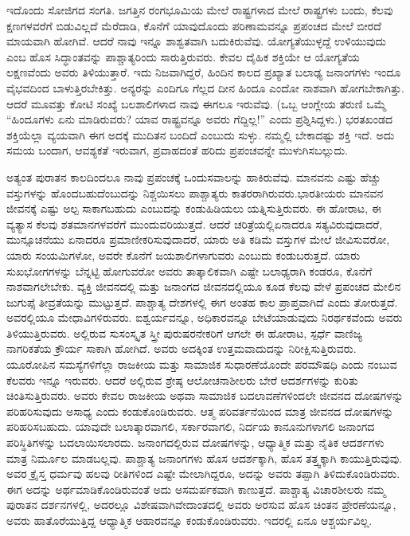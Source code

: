 ಇದೊಂದು ಸೋಜಿಗದ ಸಂಗತಿ. ಜಗತ್ತಿನ ರಂಗಭೂಮಿಯ ಮೇಲೆ ರಾಷ್ಟ್ರಗಳಾದ ಮೇಲೆ ರಾಷ್ಟ್ರಗಳು ಬಂದು, ಕೆಲವು ಕ್ಷಣಗಳವರೆಗೆ ಬಿಡುವಿಲ್ಲದೆ ಮೆರೆದಾಡಿ, ಕೊನೆಗೆ ಯಾವುದೊಂದು ಪರಿಣಾಮವನ್ನೂ ಪ್ರಪಂಚದ ಮೇಲೆ ಬೀರದೆ ಮಾಯವಾಗಿ ಹೋಗಿವೆ. ಆದರೆ ನಾವು ಇನ್ನೂ ಶಾಶ್ವತವಾಗಿ ಬದುಕಿರು\-ವೆವು. ಯೋಗ್ಯತೆಯುಳ್ಳದ್ದೆ ಉಳಿಯುವುದು ಎಂಬ ಹೊಸ ಸಿದ್ಧಾಂತವನ್ನು ಪಾಶ್ಚಾತ್ಯರಿಂದು ಸಾರುತ್ತಿರುವರು. ಕೇವಲ ದೈಹಿಕ ಶಕ್ತಿಯೇ ಆ ಯೋಗ್ಯತೆಯ ಲಕ್ಷಣವೆಂದು ಅವರು ತಿಳಿಯುತ್ತಾರೆ. ಇದು ನಿಜವಾಗಿದ್ದರೆ, ಹಿಂದಿನ ಕಾಲದ ಪ್ರಖ್ಯಾತ ಬಲಾಢ್ಯ ಜನಾಂಗಗಳು ಇಂದೂ ವೈಭವದಿಂದ ಬಾಳುತ್ತಿರಬೇಕಿತ್ತು. ಅನ್ಯರನ್ನು ಎಂದಿಗೂ ಗೆಲ್ಲದ ದೀನ ಹಿಂದೂ ಎಂದೋ ನಾಶವಾಗಿ ಹೋಗಬೇಕಾಗಿತ್ತು. ಆದರೆ ಮೂವತ್ತು ಕೋಟಿ ಸಂಖ್ಯೆ ಬಲಶಾಲಿಗಳಾದ ನಾವು ಈಗಲೂ ಇರುವೆವು. (ಒಬ್ಬ ಆಂಗ್ಲೇಯ ತರುಣಿ ಒಮ್ಮೆ “ಹಿಂದೂಗಳು ಏನು ಮಾಡಿರುವರು? ಯಾವ ರಾಷ್ಟ್ರವನ್ನೂ ಅವರು ಗೆದ್ದಿಲ್ಲ!” ಎಂದು ಪ್ರಶ್ನಿಸಿದ್ದಳು.) ಭರತಖಂಡದ ಶಕ್ತಿಯೆಲ್ಲಾ ವ್ಯಯವಾಗಿ ಈಗ ಅದಕ್ಕೆ ಮುದಿತನ ಬಂದಿದೆ ಎಂಬುದು ಸುಳ್ಳು. ನಮ್ಮಲ್ಲಿ ಬೇಕಾದಷ್ಟು ಶಕ್ತಿ ಇದೆ. ಅದು ಸಮಯ ಬಂದಾಗ, ಆವಶ್ಯಕತೆ ಇರುವಾಗ, ಪ್ರವಾಹದಂತೆ ಹರಿದು ಪ್ರಪಂಚವನ್ನೇ ಮುಳುಗಿಸಬಲ್ಲುದು.

ಅತ್ಯಂತ ಪುರಾತನ ಕಾಲದಿಂದಲೂ ನಾವು ಪ್ರಪಂಚಕ್ಕೆ ಒಂದು\break ಸವಾಲನ್ನು ಹಾಕಿರು\-ವೆವು. ಮಾನವನು ಎಷ್ಟು ಹೆಚ್ಚು ವಸ್ತುಗಳನ್ನು ಹೊಂದ\-ಬಹುದೆಂಬುದನ್ನು ನಿಶ್ಚಯಿಸಲು ಪಾಶ್ಚಾತ್ಯರು ಕಾತರರಾಗಿರುವರು.\break ಭಾರತೀಯರು ಮಾನವನ ಜೀವನಕ್ಕೆ ಎಷ್ಟು ಅಲ್ಪ ಸಾಕಾಗಬಹುದು ಎಂಬುದನ್ನು ಕಂಡುಹಿಡಿಯಲು ಯತ್ನಿಸುತ್ತಿರುವರು. ಈ ಹೋರಾಟ, ಈ ವ್ಯತ್ಯಾಸ ಕೆಲವು ಶತಮಾನಗಳವರೆಗೆ ಮುಂದುವರಿಯುತ್ತದೆ. ಆದರೆ ಚರಿತ್ರೆಯಲ್ಲಿ\break ಏನಾದರೂ ಸತ್ಯವಿರುವುದಾದರೆ, ಮುನ್ಸೂಚನೆಯು ಏನಾದರೂ ಪ್ರಮಾಣೀಕರಿಸುವುದಾದರೆ, ಯಾರು ಅತಿ ಕಡಿಮೆ ವಸ್ತುಗಳ ಮೇಲೆ ಜೀವಿಸುವರೋ, ಯಾರು ಸಂಯಮಿಗಳೋ, ಅವರೇ ಕೊನೆಗೆ ಜಯಶಾಲಿಗಳಾಗುವರು ಎಂಬುದು ಕಂಡುಬರುತ್ತದೆ. ಯಾರು ಸುಖಭೋಗಗಳನ್ನು ಬೆನ್ನಟ್ಟಿ ಹೋಗುವರೋ ಅವರು ತಾತ್ಕಾಲಿಕವಾಗಿ ಎಷ್ಟೇ ಬಲಾಢ್ಯರಾಗಿ ಕಂಡರೂ, ಕೊನೆಗೆ ನಾಶವಾಗಲೇಬೇಕು. ವ್ಯಕ್ತಿ ಜೀವನದಲ್ಲಿ ಮತ್ತು ಜನಾಂಗದ ಜೀವನದಲ್ಲಿಯೂ ಕೂಡ ಕೆಲವು ವೇಳೆ ಪ್ರಪಂಚದ ಮೇಲಿನ ಜುಗುಪ್ಸೆ ತೀವ್ರತೆಯನ್ನು ಮುಟ್ಟುತ್ತದೆ. ಪಾಶ್ಚಾತ್ಯ ದೇಶಗಳಲ್ಲಿ ಈಗ ಅಂತಹ ಕಾಲ ಪ್ರಾಪ್ತವಾಗಿದೆ ಎಂದು ತೋರುತ್ತದೆ. ಅವರಲ್ಲಿಯೂ ಮೇಧಾವಿಗಳಿರುವರು. ಐಶ್ವರ್ಯವನ್ನೂ, ಅಧಿಕಾರವನ್ನೂ ಬೇಟೆ\-ಯಾಡುವುದು ನಿರರ್ಥಕವೆಂದು ಅವರು ತಿಳಿಯುತ್ತಿರುವರು. ಅಲ್ಲಿರುವ ಸುಸಂಸ್ಕೃತ ಸ್ತ್ರೀ ಪುರುಷರನೇಕರಿಗೆ ಆಗಲೇ ಈ ಹೋರಾಟ, ಸ್ಪರ್ಧೆ ವಾಣಿಜ್ಯ ನಾಗರಿಕತೆಯ ಕ್ರೌರ್ಯ ಸಾಕಾಗಿ ಹೋಗಿದೆ. ಅವರು ಅದಕ್ಕಿಂತ ಉತ್ತಮವಾದುದನ್ನು ನಿರೀಕ್ಷಿಸುತ್ತಿರುವರು. ಯೂರೋಪಿನ ಸಮಸ್ಯೆಗಳಿಗೆಲ್ಲಾ ರಾಜಕೀಯ ಮತ್ತು ಸಾಮಾಜಿಕ ಸುಧಾರಣೆಯೊಂದೇ ಪರಮೌಷಧಿ ಎಂದು ನಂಬುವ ಕೆಲವರು ಇನ್ನೂ ಇರುವರು. ಆದರೆ ಅಲ್ಲಿರುವ ಶ್ರೇಷ್ಠ ಆಲೋಚನಾಶೀಲರು ಬೇರೆ ಆದರ್ಶಗಳನ್ನು ಕುರಿತು ಚಿಂತಿಸುತ್ತಿರುವರು. ಅವರು ಕೇವಲ ರಾಜಕೀಯ ಅಥವಾ ಸಾಮಾಜಿಕ ಬದಲಾವಣೆಗಳಿಂದಲೇ ಜೀವನದ ದೋಷಗಳನ್ನು ಪರಿಹರಿಸುವುದು ಅಸಾಧ್ಯ ಎಂದು ಕಂಡುಕೊಂಡಿರುವರು. ಆತ್ಮ ಪರಿವರ್ತನೆಯಿಂದ ಮಾತ್ರ ಜೀವನದ ದೋಷಗಳನ್ನು ಪರಿಹರಿಸಬಹುದು. ಯಾವುದೇ ಬಲಾತ್ಕಾರವಾಗಲಿ, ಸರ್ಕಾರವಾಗಲಿ, ನಿರ್ದಯ ಕಾನೂನುಗಳಾಗಲಿ ಜನಾಂಗದ ಪರಿಸ್ಥಿತಿಗಳನ್ನು ಬದಲಾಯಿಸಲಾರದು. ಜನಾಂಗದಲ್ಲಿರುವ ದೋಷಗಳನ್ನು, ಆಧ್ಯಾತ್ಮಿಕ ಮತ್ತು ನೈತಿಕ ಆದರ್ಶಗಳು ಮಾತ್ರ ನಿರ್ಮೂಲ ಮಾಡಬಲ್ಲವು. ಪಾಶ್ಚಾತ್ಯ ಜನಾಂಗಗಳು ಹೊಸ ಆದರ್ಶಕ್ಕಾಗಿ, ಹೊಸ ತತ್ತ್ವಕ್ಕಾಗಿ ಕಾಯುತ್ತಿರುವುವು. ಅವರ ಕ್ರೈಸ್ತ ಧರ್ಮವು ಹಲವು ರೀತಿಗಳಿಂದ ಎಷ್ಟೇ ಮೇಲಾಗಿದ್ದರೂ, ಅದನ್ನು ಅವರು ತಪ್ಪಾಗಿ ತಿಳಿದುಕೊಂಡಿರುವರು. ಈಗ ಅದನ್ನು ಅರ್ಥಮಾಡಿಕೊಂಡಿರುವಂತೆ ಅದು ಅಸಮರ್ಪಕವಾಗಿ ಕಾಣುತ್ತದೆ. ಪಾಶ್ಚಾತ್ಯ ವಿಚಾರಶೀಲರು ನಮ್ಮ ಪುರಾತನ ದರ್ಶನಗಳಲ್ಲಿ, ಅದರಲ್ಲೂ ವಿಶೇಷವಾಗಿ\break ವೇದಾಂತದಲ್ಲಿ ಅವರು ಅರಸುವ ಹೊಸ ಚಿಂತನ ಪ್ರೇರಣೆಯನ್ನೂ, ಅವರು ಹಾತೊರೆಯುತ್ತಿದ್ದ ಆಧ್ಯಾತ್ಮಿಕ ಆಹಾರವನ್ನೂ ಕಂಡುಕೊಂಡಿರುವರು. ಇದರಲ್ಲಿ ಏನೂ ಆಶ್ಚರ್ಯವಿಲ್ಲ.

